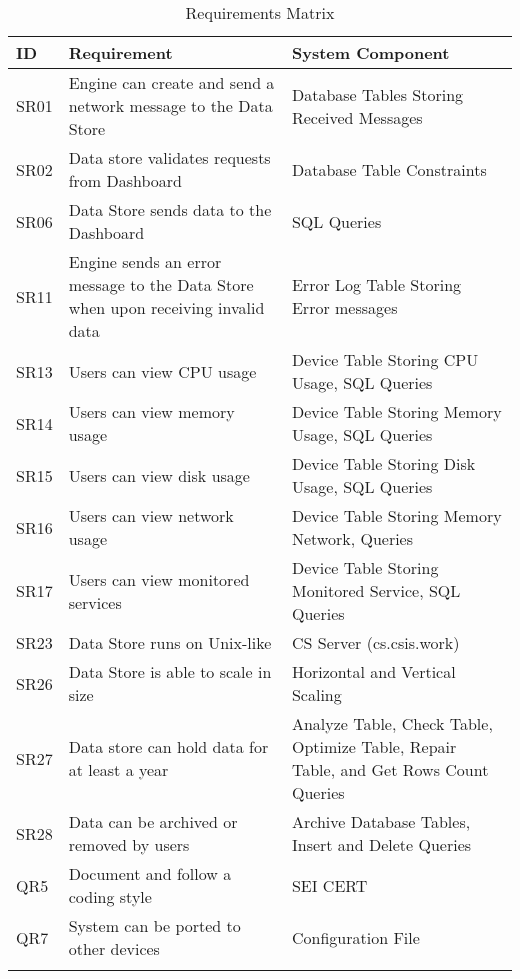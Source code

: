\documentclass[letterpaper,12pt,oneside,listof=totoc]{scrreprt}
\begin{document}
\begin{longtable}{ p{} |  p{} | p{} }
\hline
\textbf{ID} & \textbf{Requirement} & \textbf{System Component} \\
\hline
SR01 & Engine can create and send a network message to the Data Store & Database Tables Storing Received Messages\\
\hline
SR02 & Data store validates requests from Dashboard & Database Table Constraints\\
\hline
SR06 & Data Store sends data to the Dashboard & SQL Queries\\
\hline
SR11 & Engine sends an error message to the Data Store when upon receiving invalid data & Error Log Table Storing Error messages\\
\hline
SR13 & Users can view CPU usage & Device Table Storing CPU Usage, SQL Queries \\
\hline
SR14 & Users can view memory usage & Device Table Storing Memory Usage, SQL Queries\\
\hline
SR15 & Users can view disk usage & Device Table Storing Disk Usage, SQL Queries\\
\hline
SR16 & Users can view network usage & Device Table Storing Memory Network, Queries\\
\hline
SR17 & Users can view monitored services & Device Table Storing Monitored Service, SQL Queries\\
\hline
SR23 & Data Store runs on Unix-like & CS Server (cs.csis.work)\\
\hline
SR26 & Data Store is able to scale in size & Horizontal and Vertical Scaling\\
\hline
SR27 & Data store can hold data for at least a year & Analyze Table, Check Table, Optimize Table, Repair Table, and Get Rows Count Queries\\
\hline
SR28 & Data can be archived or removed by users & Archive Database Tables, Insert and Delete Queries\\
\hline
QR5 & Document and follow a coding style & SEI CERT\\
\hline
QR7 & System can be ported to other devices & Configuration File\\
\hline
\caption{Requirements Matrix}
\label{Requirements Matrix}
\end{longtable}
\end{document}
